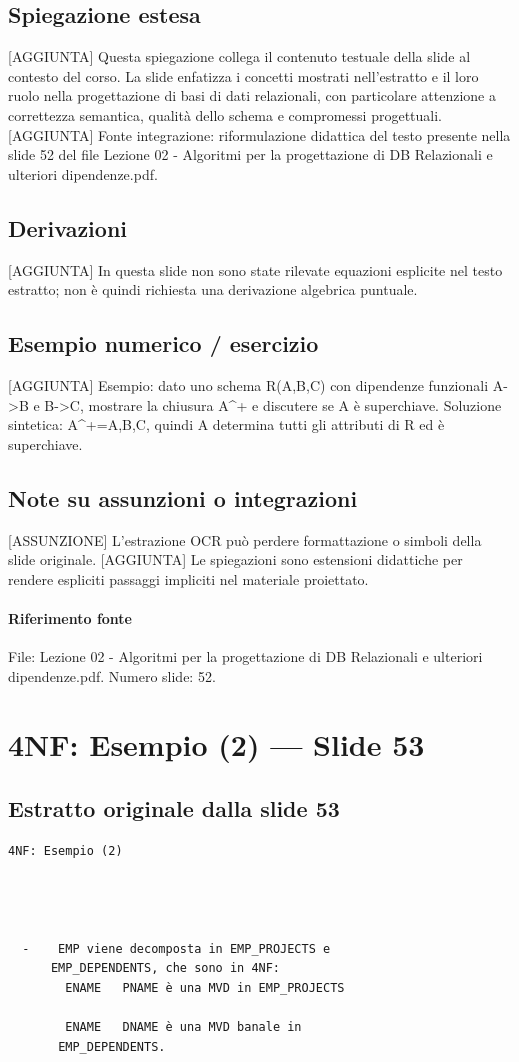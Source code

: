 \documentclass[11pt]{article}
\begin{document}
\subsection*{Spiegazione estesa}
[AGGIUNTA] Questa spiegazione collega il contenuto testuale della slide al contesto del corso. La slide enfatizza i concetti mostrati nell'estratto e il loro ruolo nella progettazione di basi di dati relazionali, con particolare attenzione a correttezza semantica, qualità dello schema e compromessi progettuali.
[AGGIUNTA] Fonte integrazione: riformulazione didattica del testo presente nella slide 52 del file Lezione 02 - Algoritmi per la progettazione di DB Relazionali e ulteriori dipendenze.pdf.
\subsection*{Derivazioni}
[AGGIUNTA] In questa slide non sono state rilevate equazioni esplicite nel testo estratto; non è quindi richiesta una derivazione algebrica puntuale.
\subsection*{Esempio numerico / esercizio}
[AGGIUNTA] Esempio: dato uno schema R(A,B,C) con dipendenze funzionali A->B e B->C, mostrare la chiusura A^+ e discutere se A è superchiave. Soluzione sintetica: A^+={A,B,C}, quindi A determina tutti gli attributi di R ed è superchiave.
\subsection*{Note su assunzioni o integrazioni}
[ASSUNZIONE] L'estrazione OCR può perdere formattazione o simboli della slide originale.
[AGGIUNTA] Le spiegazioni sono estensioni didattiche per rendere espliciti passaggi impliciti nel materiale proiettato.
\paragraph{Riferimento fonte} File: Lezione 02 - Algoritmi per la progettazione di DB Relazionali e ulteriori dipendenze.pdf. Numero slide: 52.
\section{4NF: Esempio (2) --- Slide 53}
\subsection*{Estratto originale dalla slide 53}
\begin{lstlisting}
4NF: Esempio (2)




  -    EMP viene decomposta in EMP_PROJECTS e
      EMP_DEPENDENTS, che sono in 4NF:
        ENAME   PNAME è una MVD in EMP_PROJECTS

        ENAME   DNAME è una MVD banale in
       EMP_DEPENDENTS.
\end{lstlisting}
\end{document}
